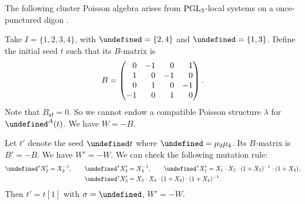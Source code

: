 \documentclass[10pt,a4paper]{amsart}
\newcommand{\opname}[1]{\operatorname{\mathsf{#1}}}
\newcommand{\fv}{\opname{f}}
\newcommand{\ufv}{\opname{uf}}
\let\Iufv\undefined
\let\Ifv\undefined
\let\LP\undefined
\let\Id\undefined
\let\seq\undefined
\newcommand{\Iufv}{I_{\ufv}}
\newcommand{\Ifv}{I_{\fv}}
\newcommand{\LP}{{\mathcal{LP}}}
\newcommand{\Id}{{\opname{Id}}}
\newcommand{\seq}{\boldsymbol{\mu}}%
\numberwithin{equation}{section}
\begin{document}
\begin{Example}
The following cluster Poisson algebra arises from ${\rm PGL}_{3}$-local
systems on a once-punctured digon \cite{schrader2019cluster}.

Take $I=\{1,2,3,4\}$, with $\Iufv=\{2,4\}$ and $\Ifv=\{1,3\}$.
Define the initial seed $t$ such that its $B$-matrix is \[B=\begin{pmatrix}
\hphantom{-}0 & -1 & \hphantom{-}0 & \hphantom{-}1\\
\hphantom{-}1 & \hphantom{-}0 & -1 & \hphantom{-}0\\
\hphantom{-}0 & \hphantom{-}1 & \hphantom{-}0 & -1\\
-1 & \hphantom{-}0 & \hphantom{-}1 & \hphantom{-}0
\end{pmatrix}.\] Note that $B_{\ufv}=0$. So we cannot endow a compatible Poisson
structure $\lambda$ for $\LP^{A}(t)$. We have $W=-B$.

Let $t'$ denote the seed $\seq t$ where $\seq=\mu_{2}\mu_{4}$.
Its $B$-matrix is $B'=-B$. We have $W'=-W$. We can check the following
mutation rule:
\begin{gather*}
\seq^{*}X_{2}' =X_{2}^{-1},\qquad
\seq^{*}X_{4}' =X_{4}^{-1},\qquad
\seq^{*}X_{1}' =X_{1}\cdot X_{2}\cdot(1+X_{2})^{-1}\cdot(1+X_{4}),\\
\seq^{*}X_{3}' =X_{3}\cdot X_{4}\cdot(1+X_{2})\cdot(1+X_{4})^{-1}.
\end{gather*}
Then $t'=t[1]$ with $\sigma=\Id$, $W'=-W$.


\end{Example}
\end{document}
